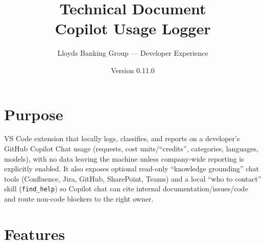 \documentclass[11pt,a4paper]{article}
\title{\color{lloydsblue}\textbf{Technical Document}\\[4pt]\Large Copilot Usage Logger}
\author{Lloyds Banking Group --- Developer Experience}
\date{Version 0.11.0}
\newcommand{\code}[1]{\texttt{\color{lloydsblue!80!black}#1}}
\begin{document}
\sloppy
\maketitle
\thispagestyle{fancy}


\tableofcontents
\newpage

\section{Purpose}

VS Code extension that locally logs, classifies, and reports on a
developer's GitHub Copilot Chat usage (requests, cost units/``credits'',
categories, languages, models), with no data leaving the machine unless
company-wide reporting is explicitly enabled. It also exposes optional
read-only ``knowledge grounding'' chat tools (Confluence, Jira, GitHub,
SharePoint, Teams) and a local ``who to contact'' skill (\code{find\_help})
so Copilot chat can cite internal documentation/issues/code and route
non-code blockers to the right owner.

\section{Features}
\end{document}
